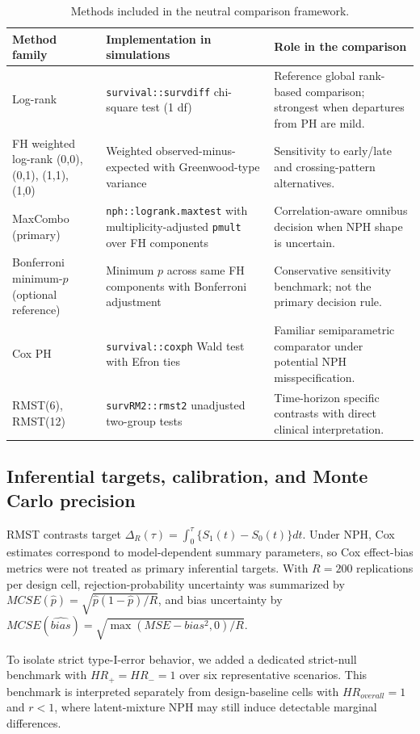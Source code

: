 \documentclass[11pt]{article}
\begin{document}
\begin{table}[H]
\centering
\small
\begin{tabularx}{\textwidth}{p{} p{} X}
\toprule
Method family & Implementation in simulations & Role in the comparison \\
\midrule
Log-rank & \texttt{survival::survdiff} chi-square test (1 df) & Reference global rank-based comparison; strongest when departures from PH are mild. \\
FH weighted log-rank (0,0), (0,1), (1,1), (1,0) & Weighted observed-minus-expected with Greenwood-type variance \citep{harrington1982,fleming1991,magirr2019} & Sensitivity to early/late and crossing-pattern alternatives. \\
MaxCombo (primary) & \texttt{nph::logrank.maxtest} with multiplicity-adjusted \texttt{pmult} over FH components \citep{ristl2021} & Correlation-aware omnibus decision when NPH shape is uncertain. \\
Bonferroni minimum-\(p\) (optional reference) & Minimum \(p\) across same FH components with Bonferroni adjustment & Conservative sensitivity benchmark; not the primary decision rule. \\
Cox PH & \texttt{survival::coxph} Wald test with Efron ties \citep{cox1972} & Familiar semiparametric comparator under potential NPH misspecification. \\
RMST(6), RMST(12) & \texttt{survRM2::rmst2} unadjusted two-group tests \citep{uno2014,cho2021} & Time-horizon specific contrasts with direct clinical interpretation. \\
\bottomrule
\end{tabularx}
\caption{Methods included in the neutral comparison framework.}
\label{tab:methods}
\end{table}

\subsection{Inferential targets, calibration, and Monte Carlo precision}
RMST contrasts target $\Delta_R(\tau)=\int_0^\tau\{S_1(t)-S_0(t)\}dt$. Under NPH, Cox estimates correspond to model-dependent summary parameters, so Cox effect-bias metrics were not treated as primary inferential targets. With $R=200$ replications per design cell, rejection-probability uncertainty was summarized by $MCSE(\hat p)=\sqrt{\hat p(1-\hat p)/R}$, and bias uncertainty by $MCSE(\widehat{bias})=\sqrt{\max(MSE-bias^2,0)/R}$.

To isolate strict type-I-error behavior, we added a dedicated strict-null benchmark with $HR_+=HR_-=1$ over six representative scenarios. This benchmark is interpreted separately from design-baseline cells with $HR_{overall}=1$ and $r<1$, where latent-mixture NPH may still induce detectable marginal differences.
\end{document}
